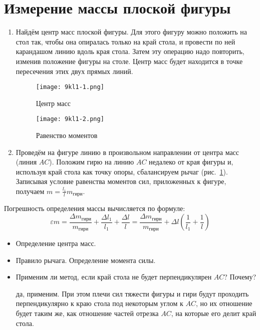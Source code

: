 \section{Измерение массы плоской фигуры}
\SolveVariant
\begin{enumerate}
\item Найдём центр масс плоской фигуры. Для этого фигуру можно положить на стол так, чтобы она опиралась только на край стола, и провести по ней карандашом линию вдоль края стола. Затем эту операцию надо повторить, изменив положение фигуры на столе. Центр масс будет находится в точке пересечения этих двух прямых линий.\par
\begin{figure}[h]
  \parbox[b]{0.49\textwidth}{
    \centering
    \texttt{[image: 9kl1-1.png]}
    \caption{Центр масс}
  }
  \hfil
  \parbox[b]{0.49\textwidth}{
    \centering
    \texttt{[image: 9kl1-2.png]}
    \caption{Равенство моментов}
    \label{fig:9kl1:moments}
  }
\end{figure}
\item Проведём на фигуре линию в произвольном направлении от центра масс (линия \( AC \)). Положим гирю на линию \( AC \) недалеко от края фигуры и, используя край стола как точку опоры, сбалансируем рычаг (рис.~\ref{fig:9kl1:moments}). Записывая условие равенства моментов сил, приложенных к фигуре, получаем \( m=\frac{l_1}{l} m_\text{гири} \).
\end{enumerate}
\MesErrors
Погрешность определения массы вычисляется по формуле:
\begin{equation*}
\varepsilon m = \frac{\Delta m_\text{гири}}{m_\text{гири}} + \frac{\Delta l_1}{l_1} + \frac{\Delta l}{l}=\frac{\Delta m_\text{гири}}{m_\text{гири}} + \Delta l\left( \frac{1}{l_1} + \frac{1}{l}\right)
\end{equation*}
\SchoolBase
\begin{itemize}
  \item Определение центра масс.
  \item Правило рычага. Определение момента силы.
\end{itemize}
\AdditionalQuestions
\begin{itemize}
  \item Применим ли метод, если край стола не будет перпендикулярен  \( AC \)? Почему?\par
    \Answer да, применим. При этом плечи сил тяжести фигуры и гири будут проходить перпендикулярно к краю стола под некоторым углом к \( AC \), но их отношение будет таким же, как отношение частей отрезка \( AC \), на которые его делит край стола.
\end{itemize}

